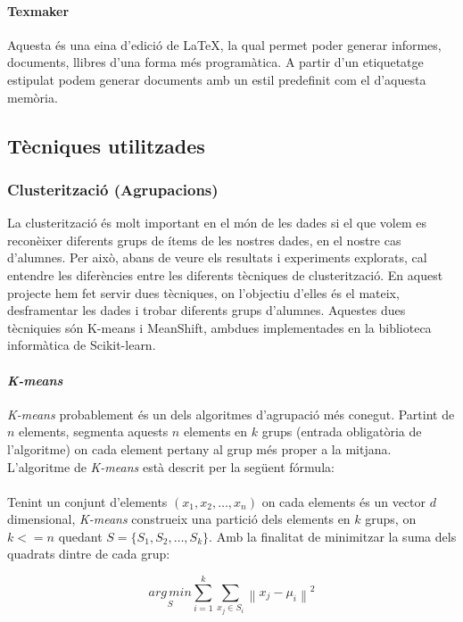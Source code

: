\documentclass[12pt,a4paper,catalan]{article}
\begin{document}
\paragraph{Texmaker}
Aquesta és una eina d'edició de \LaTeX, la qual permet poder generar informes, documents, llibres d'una forma més programàtica. A partir d'un etiquetatge estipulat podem generar documents amb un estil predefinit com el d'aquesta memòria.

\newpage
\hypertarget{tecniquesutilitzades}{
	\subsection{Tècniques utilitzades}
}
\subsubsection{Clusterització (Agrupacions)}
La clusterització és molt important en el món de les dades si el que volem es reconèixer diferents grups de ítems de les nostres dades, en el nostre cas d'alumnes. Per això, abans de veure els resultats i experiments explorats, cal entendre les diferències entre les diferents tècniques de clusterització. En aquest projecte hem fet servir dues tècniques, on l'objectiu d'elles és el mateix, desframentar les dades i trobar diferents grups d'alumnes. Aquestes dues tècniquies són K-means i MeanShift, ambdues implementades en la biblioteca informàtica de Scikit-learn. 

\paragraph{\textit{K-means}}
\textit{K-means} probablement és un dels algoritmes d'agrupació més conegut. Partint de $n$ elements, segmenta aquests $n$ elements en $k$ grups (entrada obligatòria de l'algoritme) on cada element pertany al grup més proper a la mitjana. L'algoritme de \textit{K-means} està descrit per la següent fórmula:
\\
\\
Tenint un conjunt d'elements $(x_1, x_2, \ldots, x_n)$ on cada elements és un vector $d$ dimensional, \textit{K-means} construeix una partició dels elements en $k$ grups, on $k <= n$ quedant $S = \{S_1, S_2, \ldots, S_k\}$. Amb la finalitat de minimitzar la suma dels quadrats dintre de cada grup:

$$ \underset{S} {arg\,min} \sum_{i=1}^{k} \sum_{x_j \in S_i} \left\| x_j - \mu_i \right\|^2 $$
\end{document}
